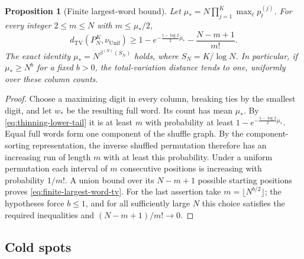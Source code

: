 \documentclass[11pt]{article}
\numberwithin{equation}{section}
\newtheorem{proposition}[theorem]{Proposition}
\theoremstyle{definition}
\theoremstyle{remark}
\newcommand{\TV}{\mathrm{TV}}
\newcommand{\Unif}{\mathrm{Unif}}
\newcommand{\dTV}{d_{\TV}}
\newcommand{\nuUnif}{\nu_{\Unif}}
\newcommand{\1}{\mathbf 1}
\begin{document}
\begin{proposition}[Finite largest-word bound]
\label{prop:largest-prefix}
Let
\(\mu_*=N\prod_{j=1}^{K}\max_\ell p^{(j)}_\ell\).
For every integer \(2\le m\le N\) with \(m\le\mu_*/2\),
\begin{equation}
\label{eq:finite-largest-word-tv}
 \dTV(P_N^{K},\nuUnif)
 \ge1-e^{-\frac{1-\log2}{2}\mu_*}-\frac{N-m+1}{m!}.
\end{equation}
The exact identity $\mu_*=N^{\beta^{(N)}(S_N)}$ holds, where $S_N=K/\log N$. In particular, if \(\mu_*\ge N^b\) for a fixed \(b>0\), the
total-variation distance tends to one, uniformly over these column counts.
\end{proposition}

\begin{proof}
Choose a maximizing digit in every column, breaking ties by the smallest
digit, and let \(w_*\) be the resulting full word. Its count has mean
\(\mu_*\). By \eqref{eq:thinning-lower-tail} it is at least \(m\)
with probability at least \(1-e^{-\frac{1-\log2}{2}\mu_*}\).
Equal full words form one component of the shuffle graph. By
the component-sorting representation, the inverse shuffled permutation
therefore has an increasing run of length \(m\) with at least this
probability. Under a uniform permutation each interval of \(m\) consecutive
positions is increasing with probability \(1/m!\). A union bound over
its \(N-m+1\) possible starting positions proves
\eqref{eq:finite-largest-word-tv}. For the last assertion take
\(m=\lfloor N^{b/2}\rfloor\); the hypotheses force \(b\le1\), and
for all sufficiently large \(N\) this choice satisfies the required
inequalities and \((N-m+1)/m!\to0\).
\end{proof}
\subsection{Cold spots}
\end{document}
